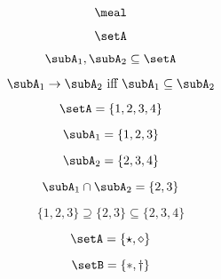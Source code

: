 {\begin{forslides}
        \begin{equation}
            \label{eq:prod-slides-12}
            \meal
        \end{equation}


        \begin{equation}
            \label{eq:prod-slides-13}
            \setA
        \end{equation}

        \begin{equation}
            \label{eq:prod-slides-14}
            \subA_1, \subA_2 \subseteq \setA
        \end{equation}

        \begin{equation}
            \label{eq:prod-slides-15}
            \subA_1 \to \subA_2 \text{ iff } \subA_1 \subseteq \subA_2
        \end{equation}


        \begin{equation}
            \label{eq:prod-slides-16}
            \setA = \{ 1, 2, 3, 4 \}
        \end{equation}

        \begin{equation}
            \label{eq:prod-slides-17}
            \subA_1 = \{ 1, 2, 3 \}
        \end{equation}

        \begin{equation}
            \label{eq:prod-slides-18}
            \subA_2 = \{2, 3, 4 \}
        \end{equation}

        \begin{equation}
            \label{eq:prod-slides-19}
            \subA_1 \cap \subA_2 = \{2, 3 \}
        \end{equation}

        \begin{equation}
            \label{eq:prod-slides-20}
            \{ 1, 2, 3 \} \supseteq \{2, 3 \} \subseteq \{2, 3, 4 \}
        \end{equation}

        \begin{equation}
            \label{eq:coprod-slides-1}
            \setA=\{\star, \diamond\}
        \end{equation}

        \begin{equation}
            \label{eq:coprod-slides-2}
            \setB=\{\ast, \dagger\}
        \end{equation}

    \end{forslides}
}


